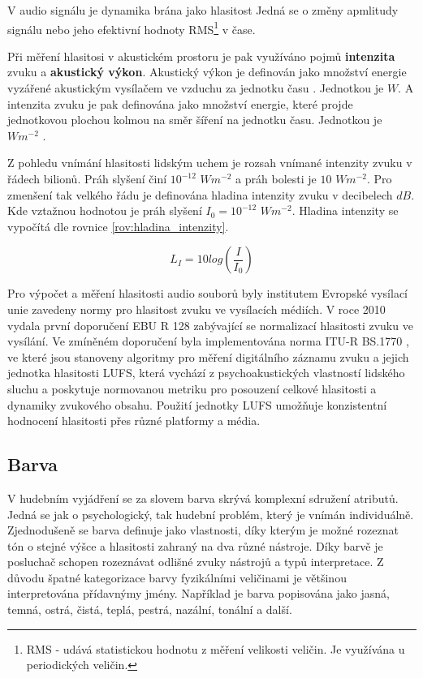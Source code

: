   V audio signálu je dynamika brána jako hlasitost  Jedná se o změny apmlitudy signálu nebo jeho efektivní hodnoty \acs{RMS}\footnote{RMS - udává statistickou hodnotu z měření velikosti veličin. Je využívána u periodických veličin\cite{RMS_value}.} v čase.

  Při měření hlasitosi  v akustickém prostoru je pak využíváno pojmů \textbf{intenzita} zvuku a \textbf{akustický výkon}.
  Akustický výkon je definován jako množství energie  vyzářené akustickým vysílačem ve vzduchu za jednotku času \cite{acoustic_power}. Jednotkou je $W$.
  A intenzita zvuku je pak definována jako množství energie, které projde jednotkovou plochou kolmou na směr šíření na jednotku času. Jednotkou je $Wm^{-2}$ \cite{intenzita_zvuku_definice}.
  
  Z pohledu vnímání hlasitosti lidským uchem je rozsah vnímané intenzity zvuku v řádech bilionů. Práh slyšení činí $10^{-12}$ $Wm^{-2}$ a práh bolesti je $10$ $Wm^{-2}$.
  Pro zmenšení tak velkého řádu je definována hladina intenzity zvuku v decibelech $dB$. Kde vztažnou hodnotou je práh slyšení $I_0 = 10^{-12}$ $Wm^{-2}$.
  Hladina intenzity se vypočítá dle rovnice \ref{rov:hladina_intenzity}.

  \begin{equation}
    L_I = 10log(\frac{I}{I_0})
    \label{rov:hladina_intenzity}
  \end{equation}

  Pro výpočet a měření hlasitosti audio souborů byly institutem Evropské vysílací unie zavedeny normy pro hlasitost zvuku ve vysílacích médiích. V roce 2010 vydala první doporučení EBU R 128 \cite{EBU_R_128} zabývající se normalizací hlasitosti zvuku ve vysílání. Ve zmíněném doporučení byla implementována norma ITU-R BS.1770 \cite{BS.1770}, ve které jsou stanoveny algoritmy pro měření digitálního záznamu zvuku a jejich jednotka hlasitosti \acs{LUFS}, která vychází z psychoakustických vlastností lidského sluchu a poskytuje normovanou metriku pro posouzení celkové hlasitosti a dynamiky zvukového obsahu. Použití jednotky \acs{LUFS} umožňuje konzistentní hodnocení hlasitosti přes různé platformy a média.

  \subsection{Barva} \label{sec:Barva}
  V hudebním vyjádření se za slovem barva skrývá komplexní sdružení atributů.
  Jedná se jak o psychologický, tak hudební problém, který je vnímán individuálně\cite{The_perception_of_musical_timbre}. Zjednodušeně se barva definuje jako vlastnosti, díky kterým je možné rozeznat tón o stejné výšce a hlasitosti zahraný na dva různé nástroje\cite{MULLER2014713}.
  Díky barvě je posluchač schopen rozeznávat odlišné zvuky nástrojů a typů interpretace. Z důvodu špatné kategorizace barvy fyzikálními veličinami je většinou interpretována přídavnýmy jmény.
  Například je barva popisována jako jasná, temná, ostrá, čistá, teplá, pestrá, nazální, tonální a další.

